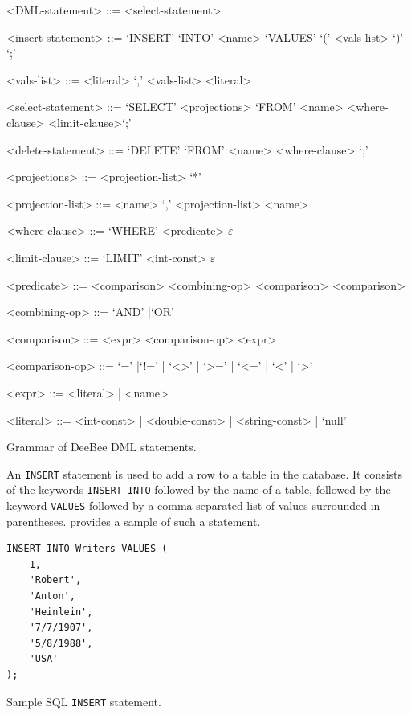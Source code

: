 \begin{listing}[h!]
\begin{grammar}
<DML-statement> ::= <select-statement>  

<insert-statement> ::= `INSERT' `INTO' <name> `VALUES' `(' <vals-list> `)' `;'

<vals-list> ::= <literal> `,' <vals-list> \alt <literal>

<select-statement> ::= `SELECT' <projections> `FROM' <name> <where-clause> <limit-clause>`;'

<delete-statement> ::= `DELETE' `FROM' <name> <where-clause> `;'

<projections> ::= <projection-list> \alt `*'

<projection-list> ::= <name> `,' <projection-list> \alt <name>

<where-clause> ::= `WHERE' <predicate> \alt $\varepsilon$

<limit-clause> ::= `LIMIT' <int-const> \alt $\varepsilon$

<predicate> ::= <comparison> <combining-op> <comparison> \alt <comparison>

<combining-op> ::= `AND'  |`OR'

<comparison> ::= <expr> <comparison-op> <expr>

<comparison-op> ::= `=' |`!=' | `<>' | `>=' | `<='  | `<' | `>'

<expr> ::= <literal> | <name>

<literal> ::= <int-const> | <double-const> | <string-const> | `null' 
\end{grammar}
\caption{Grammar of DeeBee DML statements.}
\label{lst:dml-grammar}
\end{listing}

An \texttt{INSERT} statement is used to add a row to a table in the database. It consists of the keywords \texttt{INSERT INTO} followed by the name of a table, followed by the keyword \texttt{VALUES} followed by a comma-separated list of values surrounded in parentheses.  provides a sample of such a statement.
\begin{listing}[h!]
    \begin{verbatim}
INSERT INTO Writers VALUES (
	1,
	'Robert',
	'Anton',
	'Heinlein', 
	'7/7/1907',
	'5/8/1988',
	'USA'
);
        \end{verbatim}
        \caption{Sample SQL \texttt{INSERT} statement.}
        \label{lst:insert}
        \end{listing}
        \FloatBarrier
        
